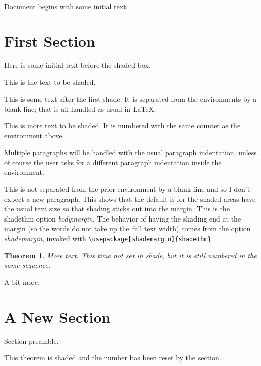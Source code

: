 \documentclass{article} %
\newtheorem{unshadedtheorem}[theorem]{Theorem}
\newtheorem{comment}{Comment}[section]
\begin{document}
Document begins with some initial text.

\section{First Section}
Here is some initial text before the shaded box.

\begin{theorem}
This is the text to be shaded.
\end{theorem}

This is some text after the first shade.
It is separated from the environments by a blank line; that is 
all handled as usual in \LaTeX.
\begin{cor}
This is more text to be shaded.
It is numbered with the same counter as the environment above.

Multiple paragraphs will be handled with the usual paragraph indentation,
unless of course the user asks for a different paragraph indentation inside
the environment.
\end{cor}
This is not separated from the prior environment by a blank line and
so I don't expect a new paragraph.
This shows that the default is for the shaded areas have the usual text size 
so that shading sticks out into the margin.
This is the shadethm option \emph{bodymargin}.
The behavior of having the shading end at the margin
(so the words do not take up the full text width)
comes from the option \emph{shademargin}, invoked with 
\verb!\usepackage[shademargin]{shadethm}!. 


\begin{unshadedtheorem}
More text.
This time not set in shade, but it is still numbered in the same sequence.
\end{unshadedtheorem}

A bit more.

\begin{comment}
More text.
This time neither set in shade, nor numbered in the same sequence.
\end{comment}


\section{A New Section}

Section preamble.

\begin{theorem}
This theorem is shaded and the number has been reset by the section.
\end{theorem}
\end{document}

